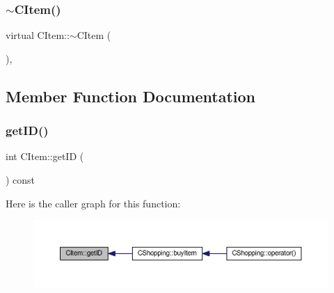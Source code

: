 \mbox{\label{class_c_item_a5c9b1084201fa4d8d41bf89603b33f0a}} 
\subsubsection{\texorpdfstring{$\sim$\+C\+Item()}{~CItem()}}
{\footnotesize\ttfamily virtual C\+Item\+::$\sim$\+C\+Item (\begin{DoxyParamCaption}{ }\end{DoxyParamCaption})\hspace{0.3cm}{\ttfamily [virtual]}, {\ttfamily [default]}}



\subsection{Member Function Documentation}
\mbox{\label{class_c_item_aa1c149049fe94513681131f65c8fdd64}} 
\subsubsection{\texorpdfstring{get\+I\+D()}{getID()}}
{\footnotesize\ttfamily int C\+Item\+::get\+ID (\begin{DoxyParamCaption}{ }\end{DoxyParamCaption}) const\hspace{0.3cm}{\ttfamily [inline]}}

Here is the caller graph for this function\+:\nopagebreak
\begin{figure}[H]
\begin{center}
\leavevmode
\includegraphics[width=350pt]{class_c_item_aa1c149049fe94513681131f65c8fdd64_icgraph}
\end{center}
\end{figure}
\mbox{\label{class_c_item_a4287076827e954d45cfa45a7bcc10999}} 
